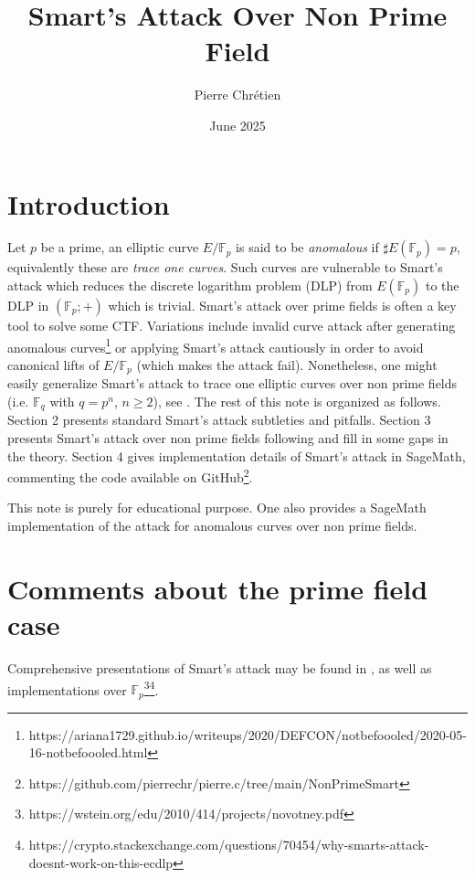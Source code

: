 \documentclass[10pt]{article}
\theoremstyle{definition}
\newcommand{\F}{\mathbb{F}}
\begin{document}

\author{Pierre Chrétien}
\title{Smart's Attack Over Non Prime Field}
\date{June 2025}
\maketitle


\section{Introduction}


Let $p$ be a prime, an elliptic curve $E/\F_p$ is said to be \textsl{anomalous} if $\sharp E(\F_p) = p$, equivalently these are \textsl{trace one curves}.
Such curves are vulnerable to Smart's attack  \cite{Sma99} which reduces the discrete logarithm problem (DLP) from $E(\F_p)$ to the DLP in $(\F_p;+)$ which is trivial.
Smart's attack over prime fields is often a key tool to solve some CTF.
Variations include invalid curve attack after generating anomalous curves\footnote{https://ariana1729.github.io/writeups/2020/DEFCON/notbefoooled/2020-05-16-notbefoooled.html} or applying Smart's attack cautiously in order to avoid canonical lifts of $E/\F_p$ (which makes the attack fail).
Nonetheless, one might easily generalize Smart's attack to trace one elliptic curves over non prime fields (i.e. $\F_q$ with $q = p^n$, $n \geq 2$), see \cite{Hofman}.
The rest of this note is organized as follows.
Section 2 presents standard Smart's attack subtleties and pitfalls.
Section 3 presents Smart's attack over non prime fields following \cite{Hofman} and fill in some gaps in the theory.
Section 4 gives implementation details of Smart's attack in SageMath, commenting the code available on GitHub\footnote{https://github.com/pierrechr/pierre.c/tree/main/NonPrimeSmart}.

This note is purely for educational purpose.
One also provides a SageMath implementation of the attack for anomalous curves over non prime fields.
\section{Comments about the prime field case}

Comprehensive presentations of Smart's attack may be found in \cite{Hofman}, \cite{LEPREVOST2005225} as well as implementations over $\F_p$\footnote{https://wstein.org/edu/2010/414/projects/novotney.pdf}\footnote{https://crypto.stackexchange.com/questions/70454/why-smarts-attack-doesnt-work-on-this-ecdlp}.
\end{document}
